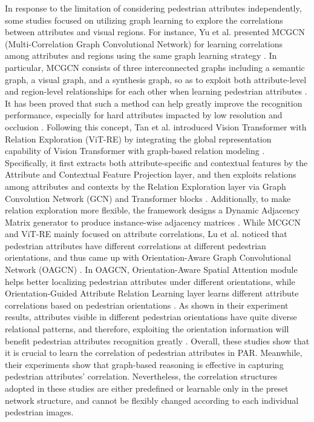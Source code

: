\documentclass{ieeeaccess}
\begin{document}
In response to the limitation of considering pedestrian attributes independently, some studies focused on utilizing graph learning to explore the correlations between attributes and visual regions. For instance, Yu et al. presented MCGCN (Multi-Correlation Graph Convolutional Network) for learning correlations among attributes and regions using the same graph learning strategy \cite{bib3}. In particular, MCGCN consists of three interconnected graphs including a semantic graph, a visual graph, and a synthesis graph, so as to exploit both attribute-level and region-level relationships for each other when learning pedestrian attributes \cite{bib3}. It has been proved that such a method can help greatly improve the recognition performance, especially for hard attributes impacted by low resolution and occlusion \cite{bib3}. Following this concept, Tan et al. introduced Vision Transformer with Relation Exploration (ViT-RE) by integrating the global representation capability of Vision Transformer with graph-based relation modeling \cite{bib4}. Specifically, it first extracts both attribute-specific and contextual features by the Attribute and Contextual Feature Projection layer, and then exploits relations among attributes and contexts by the Relation Exploration layer via Graph Convolution Network (GCN) and Transformer blocks \cite{bib4}. Additionally, to make relation exploration more flexible, the framework designs a Dynamic Adjacency Matrix generator to produce instance-wise adjacency matrices \cite{bib4}. While MCGCN and ViT-RE mainly focused on attribute correlations, Lu et al. noticed that pedestrian attributes have different correlations at different pedestrian orientations, and thus came up with Orientation-Aware Graph Convolutional Network (OAGCN) \cite{bib5}. In OAGCN, Orientation-Aware Spatial Attention module helps better localizing pedestrian attributes under different orientations, while Orientation-Guided Attribute Relation Learning layer learns different attribute correlations based on pedestrian orientations \cite{bib5}. As shown in their experiment results, attributes visible in different pedestrian orientations have quite diverse relational patterns, and therefore, exploiting the orientation information will benefit pedestrian attributes recognition greatly \cite{bib5}. Overall, these studies show that it is crucial to learn the correlation of pedestrian attributes in PAR. Meanwhile, their experiments show that graph-based reasoning is effective in capturing pedestrian attributes' correlation. Nevertheless, the correlation structures adopted in these studies are either predefined or learnable only in the preset network structure, and cannot be flexibly changed according to each individual pedestrian images.
\end{document}
